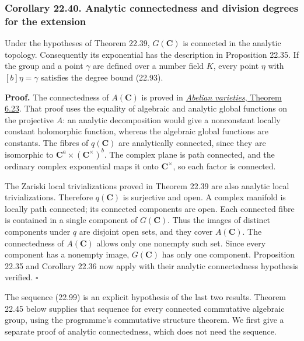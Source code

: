 \documentclass[
  11pt,
  a4paper,
]{article}
\newcounter{none} %
\begin{document}
\subsubsection{Corollary 22.40. Analytic connectedness and division
degrees for the
extension}\label{corollary-22.40.-analytic-connectedness-and-division-degrees-for-the-extension}

Under the hypotheses of Theorem 22.39, \(G(\mathbf C)\) is connected in
the analytic topology. Consequently its exponential has the description
in Proposition 22.35. If the group and a point \(\gamma\) are defined
over a number field \(K\), every point \(\eta\) with \([b]\eta=\gamma\)
satisfies the degree bound (22.93).

\textbf{Proof.} The connectedness of \(A(\mathbf C)\) is proved in
\href{https://github.com/KokunoYumeto/open-math-courses-public/blob/146dc81802e69cf262fb6cc65c1b9f74e71f4625/docs/courses/AG-GS/src/abelian-varieties.md}{\emph{Abelian
varieties}, Theorem 6.23}. That proof uses the equality of algebraic and
analytic global functions on the projective \(A\): an analytic
decomposition would give a nonconstant locally constant holomorphic
function, whereas the algebraic global functions are constants. The
fibres of \(q(\mathbf C)\) are analytically connected, since they are
isomorphic to \(\mathbf C^a\times(\mathbf C^\times)^b\). The complex
plane is path connected, and the ordinary complex exponential maps it
onto \(\mathbf C^\times\), so each factor is connected.

The Zariski local trivializations proved in Theorem 22.39 are also
analytic local trivializations. Therefore \(q(\mathbf C)\) is surjective
and open. A complex manifold is locally path connected; its connected
components are open. Each connected fibre is contained in a single
component of \(G(\mathbf C)\). Thus the images of distinct components
under \(q\) are disjoint open sets, and they cover \(A(\mathbf C)\). The
connectedness of \(A(\mathbf C)\) allows only one nonempty such set.
Since every component has a nonempty image, \(G(\mathbf C)\) has only
one component. Proposition 22.35 and Corollary 22.36 now apply with
their analytic connectedness hypothesis verified. \(\square\)

The sequence (22.99) is an explicit hypothesis of the last two results.
Theorem 22.45 below supplies that sequence for every connected
commutative algebraic group, using the programme's commutative structure
theorem. We first give a separate proof of analytic connectedness, which
does not need the sequence.
\end{document}
